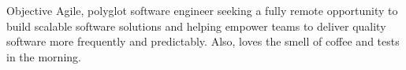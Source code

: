 \begin{section}{Objective}
  Agile, polyglot software engineer seeking a fully remote opportunity to build scalable software solutions and helping empower teams to deliver quality software more frequently and predictably. Also, loves the smell of coffee and tests in the morning.
\end{section}
